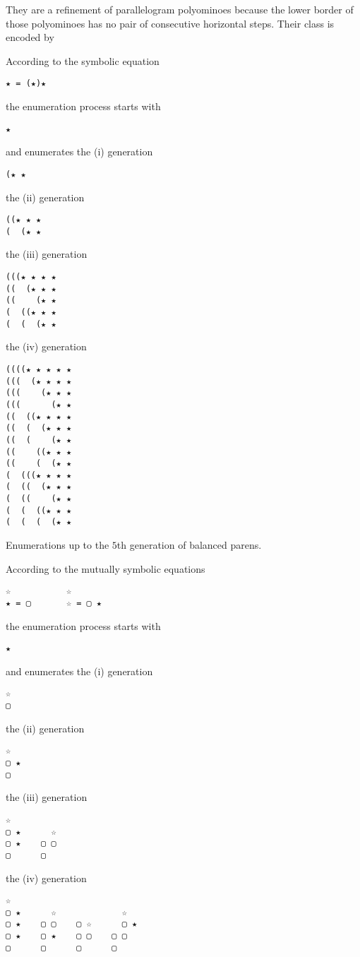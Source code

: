 \newpage
\begin{example} They are a refinement of
parallelogram polyominoes because the lower border of those polyominoes has no
pair of consecutive horizontal steps. Their class is encoded by

\begin{margintable}
\noindent According to the symbolic equation
\begin{Verbatim}[baselinestretch=0.5,fontsize=\footnotesize]
★ = (★)★
\end{Verbatim}
the enumeration process starts with
\begin{Verbatim}[baselinestretch=0.5,fontsize=\footnotesize]
★
\end{Verbatim}
and enumerates the (i) generation
\begin{Verbatim}[baselinestretch=0.5,fontsize=\footnotesize]
(★ ★
\end{Verbatim}
the (ii) generation
\begin{Verbatim}[baselinestretch=0.5,fontsize=\footnotesize]
((★ ★ ★
(  (★ ★
\end{Verbatim}
the (iii) generation
\begin{Verbatim}[baselinestretch=0.5,fontsize=\footnotesize]
(((★ ★ ★ ★
((  (★ ★ ★
((    (★ ★
(  ((★ ★ ★
(  (  (★ ★
\end{Verbatim}
the (iv) generation
\begin{Verbatim}[baselinestretch=0.5,fontsize=\footnotesize]
((((★ ★ ★ ★ ★
(((  (★ ★ ★ ★
(((    (★ ★ ★
(((      (★ ★
((  ((★ ★ ★ ★
((  (  (★ ★ ★
((  (    (★ ★
((    ((★ ★ ★
((    (  (★ ★
(  (((★ ★ ★ ★
(  ((  (★ ★ ★
(  ((    (★ ★
(  (  ((★ ★ ★
(  (  (  (★ ★
\end{Verbatim}
\caption{Enumerations up to the $5$th generation of balanced parens.}
\label{tbl:eco:balanced:parens}
\end{margintable}

\begin{margintable}
\noindent According to the mutually symbolic equations
\begin{Verbatim}[baselinestretch=0.5,fontsize=\footnotesize]
    ☆           ☆
★ = ▢       ☆ = ▢ ★
\end{Verbatim}
the enumeration process starts with
\begin{Verbatim}[baselinestretch=0.5,fontsize=\footnotesize]
★
\end{Verbatim}
and enumerates the (i) generation
\begin{Verbatim}[baselinestretch=0.5,fontsize=\footnotesize]
☆
▢
\end{Verbatim}
the (ii) generation
\begin{Verbatim}[baselinestretch=0.5,fontsize=\footnotesize]
☆
▢ ★
▢
\end{Verbatim}
the (iii) generation
\begin{Verbatim}[baselinestretch=0.5,fontsize=\footnotesize]
☆
▢ ★      ☆
▢ ★    ▢ ▢
▢      ▢
\end{Verbatim}
the (iv) generation
\begin{Verbatim}[baselinestretch=0.5,fontsize=\footnotesize]
☆
▢ ★      ☆             ☆
▢ ★    ▢ ▢    ▢ ☆      ▢ ★
▢ ★    ▢ ★    ▢ ▢    ▢ ▢
▢      ▢      ▢      ▢


\end{Verbatim}
\end{margintable}
\end{example}
